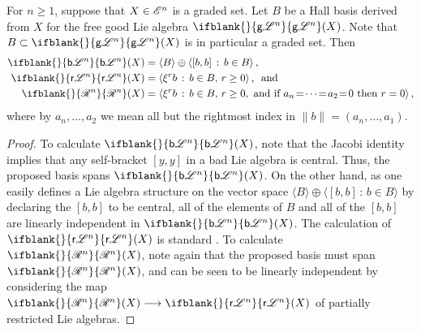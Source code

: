 \documentclass[10pt]{article}
\newcommand{\GS}[1]{\scrE^{#1}}
\newcommand{\RestLie}[1]{\mathsf{r}{\scrL}^{#1}}%
\newcommand{\GoodLie}[1]{\mathsf{g}{\scrL}^{#1}}%
\newcommand{\BadLie}[1]{\mathsf{b}{\scrL}^{#1}}%
\newcommand{\PRLie}[1]{\scrR^{#1}}%
\newcommand{\iteratedrestn}[2]{\xi^{#2}{#1}}
\newcommand{\Fr}[2][]{\ifblank{#1}{#2}{#2_{#1}}}
\begin{document}
\begin{CategoriesOfInterest}
\begin{prop}\label{PropBasesOfFreeLieAlgs}
For $n\geq1$, suppose that $X\in\GS{n}$ is a graded set. Let $B$ be a Hall basis derived from $X$ for the free good Lie algebra $\Fr{\GoodLie{n}}(X)$. Note that $B\subset \Fr{\GoodLie{n}}(X)$ is in particular a graded set. Then
\begin{alignat*}{2}
\Fr{\BadLie{n}}(X)
&=
\left\langle B\right\rangle\oplus \left\langle[b,b]\,:\,b\in B\right\rangle,%
\\
\Fr{\RestLie{n}}(X)
&=
\left\langle \iteratedrestn{b}{r}\,:\,b\in
B,\,r\geq0\right\rangle\textup{, \ and}%
\\
\Fr{\PRLie{n}}(X)
&=
\left\langle \iteratedrestn{b}{r}\,:\,b\in
B,\,r\geq0,\textup{ and if }a_{n}\!=\!\cdots\!=\!a_2\!=\!0\textup{ then $r=0$}\right\rangle,%
\end{alignat*}
where by $a_n,\ldots,a_2$ we mean all but the rightmost index in $\|b\|=(a_{n},\ldots,a_1)$.
\end{prop}
\begin{proof}
To calculate $\Fr{\BadLie{n}}(X)$,  note that the Jacobi identity implies that any self-bracket $[y,y]$ in a bad Lie algebra is central. Thus, the proposed basis spans $\Fr{\BadLie{n}}(X)$.  On the other hand, as one easily defines a Lie algebra structure on the vector space $\langle B\rangle\oplus \langle [b,b]\,:\,b\in B\rangle$ by declaring the $[b,b]$ to be central, all of the elements of $B$ and all of the $[b,b]$ are linearly independent in $\Fr{\BadLie{n}}(X)$. The calculation of $\Fr{\RestLie{n}}(X)$ is standard \cite[Proposition 14, p.66]{MR886063}.
To calculate $\Fr{\PRLie{n}}(X)$, note again that the proposed basis must span $\Fr{\PRLie{n}}(X)$, and can be seen to be linearly independent by considering the map $\Fr{\PRLie{n}}(X)\to \Fr{\RestLie{n}}(X)$ of partially restricted Lie algebras.
\end{proof}



\end{CategoriesOfInterest}
\end{document}
